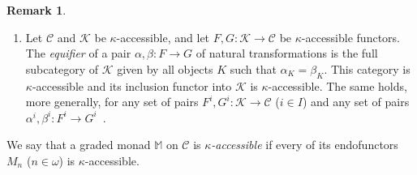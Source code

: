 \documentclass[sigconf,
			final%
			nonacm
                        ]{acmart}
\numberwithin{equation}{section}
\numberwithin{equation}{section}
\theoremstyle{plain}
\theoremstyle{definition}
\newtheorem{rem}[thm]{Remark}
\newcommand{\M}{\mathbb{M}}                   %
\newcommand{\CatC}{\mathscr{C}}           %
\newcommand{\CatK}{\mathscr{K}}
\newcommand{\K}{\mathscr{K}}
\begin{document}
\begin{rem}
\begin{enumerate}
  \item\label{R:acc:4} Let $\CatC$ and $\CatK$ be $\kappa$-accessible, and
    let $F, G\colon \CatK \to \CatC$ be $\kappa$-accessible functors.  The
    \emph{equifier} of a pair \mbox{$\alpha,\beta\colon F \to G$} of natural
    transformations is the full subcategory of $\K$ given by all
    objects $K$ such that $\alpha_K = \beta_K$. This category is
    $\kappa$-accessible and its inclusion functor into $\K$ is
    $\kappa$-accessible. The same holds, more generally,
    for any set of pairs $F^i, G^i\colon \CatK \to \CatC$ ($i \in I$)
    and any set of pairs
    $\alpha^i,\beta^i\colon F^i \to G^i$~\cite[Lem.~2.76]{AR94}.
  \end{enumerate}
\end{rem}

We say that a graded monad $\M$ on $\CatC$ is
\emph{$\kappa$-accessible} if every of its endofunctors $M_n$
($n \in \omega$) is $\kappa$-accessible.
\end{document}
